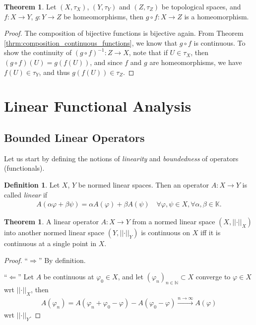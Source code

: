 \documentclass[12pt, a4paper]{article}
\numberwithin{equation}{section}
\theoremstyle{definition}
\theoremstyle{definition}
\newtheorem{defn}[thm]{Definition} %
\newtheorem{theorem}[thm]{Theorem}
\newcommand{\norm}[2]{\left\vert\left\vert #1 \right\vert\right\vert_{#2}}
\newcommand{\seq}[1][\varphi]{\left( #1 \right)_{n \in \mathbb{N}}}
\begin{document}
		\begin{theorem}\label{thrm:composition_homeomorphisms}
			Let $(X, \tau_X)$, $(Y, \tau_Y)$ and $(Z, \tau_Z)$ be topological spaces, and $f: X\to Y$, $g: Y\to Z$ be homeomorphisms, then $g\circ f: X\to Z$ is a homeomorphism.
		\end{theorem}
	
		\begin{proof}
			The composition of bijective functions is bijective again. From Theorem \ref{thrm:composition_continuous_functions}, we know that $g\circ f$ is continuous. To show the continuity of $(g\circ f)^{-1}: Z\to X$, note that if $U\in\tau_X$, then $(g\circ f)(U) = g(f(U))$, and since $f$ and $g$ are homeomorphisms, we have $f(U)\in \tau_Y$, and thus $g(f(U))\in\tau_Z$.
		\end{proof}
			
	\newpage 
	\section{Linear Functional Analysis}

	\subsection{Bounded Linear Operators}

	Let us start by defining the notions of \textit{linearity} and \textit{boundedness} of operators (\mbox{functionals}). 
	
	\begin{defn}\label{defn:linearity_operator}
		Let $X$, $Y$ be normed linear spaces. Then an operator 
		$A:X\to Y$ is called \textit{linear} if 
		\begin{align}
			A(\alpha \varphi + \beta \psi) = \alpha A(\varphi) + \beta A(\psi) \quad \forall \varphi, \psi\in X, \forall \alpha, \beta\in \mathbb K.
		\end{align}
	\end{defn}

	\begin{theorem}
		A linear operator $A: X\to Y$ from a normed linear space $(X, \norm{\cdot}{X})$ into another normed linear space $(Y, \norm{\cdot}{Y})$ is continuous on $X$ iff it is continuous at a single point in $X$.
	\end{theorem}

	\begin{proof}
		\enquote{$\Longrightarrow$} By definition. 
		
		\enquote{$\Longleftarrow$} Let $A$ be continuous at $\varphi_0\in X$, and let $\seq[\varphi_n]\subset X$ converge to $\varphi\in X$ wrt $\norm{\cdot}{X}$, then
		\begin{align}
			A(\varphi_n) = A(\varphi_n + \varphi_0 - \varphi) - A(\varphi_0 - \varphi) \overset{n\to\infty}{\longrightarrow} A(\varphi)
		\end{align} 
		wrt $\norm{\cdot}{Y}$.
	\end{proof}
	
\end{document}
